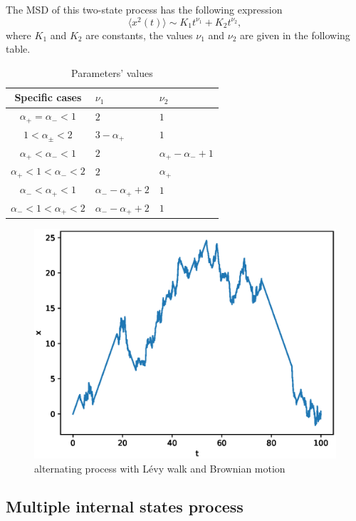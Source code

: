 \documentclass[aps, pre, preprint, amsmath, amssymb]{revtex4}
\begin{document}
The MSD of this two-state process has the following expression \cite{wang2019aging}
\begin{equation}
\langle x^2(t)\rangle \sim K_1t^{\nu_1}+K_2t^{\nu_2},
\end{equation}
where $K_1$ and $K_2$ are constants, the values $\nu_1$ and $\nu_2$ are given in the following table.
\begin{table}[H]
\centering
\caption{Parameters' values}
\begin{tabular}{|c|l|l|}
\hline
Specific cases & $\nu_1$ & $\nu_2$ \\
\hline
$\alpha_{+}=\alpha_{-}<1$ & $2$ & $1$ \\
\hline 
$1<\alpha_{\pm}<2$ &$3-\alpha_{+}$ &$1$ \\
\hline
$\alpha_{+}<\alpha_{-}<1$&$2$&$\alpha_{+}-\alpha_{-}+1$\\
\hline
$\alpha_{+}<1<\alpha_{-}<2$ & $2$ &$\alpha_{+}$ \\
\hline
$\alpha_{-}<\alpha_{+}<1$ & $\alpha_{-}-\alpha_{+}+2$ & $1$ \\
\hline
$\alpha_{-}<1<\alpha_{+}<2$ & $\alpha_{-}-\alpha_{+}+2$ & $1$\\
\hline
\end{tabular}
\end{table}
\begin{figure}[H]
\centering
\includegraphics[scale=0.5]{figures/alter}
\caption{alternating process with L\'{e}vy walk and Brownian motion}
\end{figure}

\subsection{Multiple internal states process}
\end{document}
